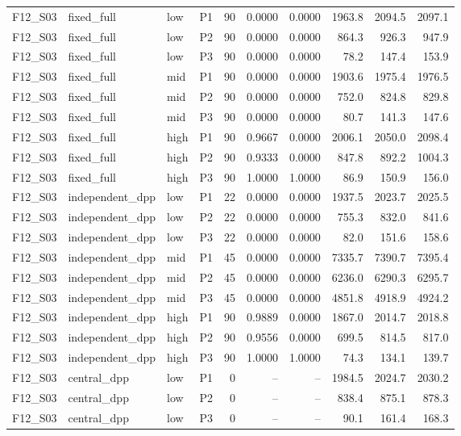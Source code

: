 \begin{longtable}{llllrrrrrr}
F12\_S03 & fixed\_full & low & P1 & 90 & 0.0000 & 0.0000 & 1963.8 & 2094.5 & 2097.1 \\
F12\_S03 & fixed\_full & low & P2 & 90 & 0.0000 & 0.0000 & 864.3 & 926.3 & 947.9 \\
F12\_S03 & fixed\_full & low & P3 & 90 & 0.0000 & 0.0000 & 78.2 & 147.4 & 153.9 \\
F12\_S03 & fixed\_full & mid & P1 & 90 & 0.0000 & 0.0000 & 1903.6 & 1975.4 & 1976.5 \\
F12\_S03 & fixed\_full & mid & P2 & 90 & 0.0000 & 0.0000 & 752.0 & 824.8 & 829.8 \\
F12\_S03 & fixed\_full & mid & P3 & 90 & 0.0000 & 0.0000 & 80.7 & 141.3 & 147.6 \\
F12\_S03 & fixed\_full & high & P1 & 90 & 0.9667 & 0.0000 & 2006.1 & 2050.0 & 2098.4 \\
F12\_S03 & fixed\_full & high & P2 & 90 & 0.9333 & 0.0000 & 847.8 & 892.2 & 1004.3 \\
F12\_S03 & fixed\_full & high & P3 & 90 & 1.0000 & 1.0000 & 86.9 & 150.9 & 156.0 \\
F12\_S03 & independent\_dpp & low & P1 & 22 & 0.0000 & 0.0000 & 1937.5 & 2023.7 & 2025.5 \\
F12\_S03 & independent\_dpp & low & P2 & 22 & 0.0000 & 0.0000 & 755.3 & 832.0 & 841.6 \\
F12\_S03 & independent\_dpp & low & P3 & 22 & 0.0000 & 0.0000 & 82.0 & 151.6 & 158.6 \\
F12\_S03 & independent\_dpp & mid & P1 & 45 & 0.0000 & 0.0000 & 7335.7 & 7390.7 & 7395.4 \\
F12\_S03 & independent\_dpp & mid & P2 & 45 & 0.0000 & 0.0000 & 6236.0 & 6290.3 & 6295.7 \\
F12\_S03 & independent\_dpp & mid & P3 & 45 & 0.0000 & 0.0000 & 4851.8 & 4918.9 & 4924.2 \\
F12\_S03 & independent\_dpp & high & P1 & 90 & 0.9889 & 0.0000 & 1867.0 & 2014.7 & 2018.8 \\
F12\_S03 & independent\_dpp & high & P2 & 90 & 0.9556 & 0.0000 & 699.5 & 814.5 & 817.0 \\
F12\_S03 & independent\_dpp & high & P3 & 90 & 1.0000 & 1.0000 & 74.3 & 134.1 & 139.7 \\
F12\_S03 & central\_dpp & low & P1 & 0 & -- & -- & 1984.5 & 2024.7 & 2030.2 \\
F12\_S03 & central\_dpp & low & P2 & 0 & -- & -- & 838.4 & 875.1 & 878.3 \\
F12\_S03 & central\_dpp & low & P3 & 0 & -- & -- & 90.1 & 161.4 & 168.3 \\

\end{longtable}
